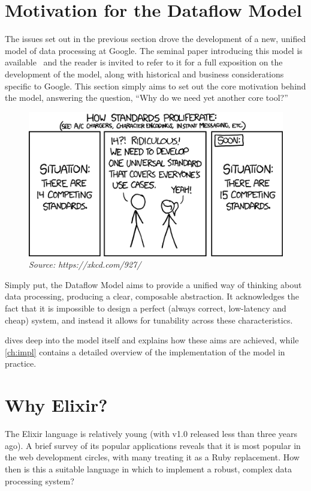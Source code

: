 \section{Motivation for the Dataflow Model}\label{sec:intro:motivation}

The issues set out in the previous section drove the development of a new, unified model of data processing at Google.
The seminal paper introducing this model is available~\cite{Akidau:2015} and the reader is invited to refer to it for a full exposition on the development of the model, along with historical and business considerations specific to Google.
This section simply aims to set out the core motivation behind the model, answering the question, ``Why do we need yet another core tool?''

\begin{figure}[h]
	\centering
	\includegraphics[width=.75\textwidth]{images/xkcd-standards}
	\caption*{\textit{Source: https://xkcd.com/927/}}
\end{figure}

Simply put, the Dataflow Model aims to provide a unified way of thinking about data processing, producing a clear, composable abstraction.
It acknowledges the fact that it is impossible to design a perfect (always correct, low-latency and cheap) system, and instead it allows for tunability across these characteristics.

 dives deep into the model itself and explains how these aims are achieved, while \cref{ch:impl} contains a detailed overview of the implementation of the model in practice.

\section{Why Elixir?}\label{sec:intro:elixir}

The Elixir language \cite{Elixir} is relatively young (with v1.0 released less than three years ago).
A brief survey of its popular applications reveals that it is most popular in the web development circles, with many treating it as a Ruby replacement.
How then is this a suitable language in which to implement a robust, complex data processing system?


